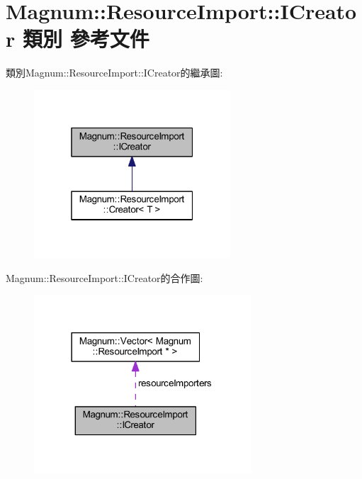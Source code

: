 \hypertarget{class_magnum_1_1_resource_import_1_1_i_creator}{}\section{Magnum\+:\+:Resource\+Import\+:\+:I\+Creator 類別 參考文件}
\label{class_magnum_1_1_resource_import_1_1_i_creator}


類別\+Magnum\+:\+:Resource\+Import\+:\+:I\+Creator的繼承圖\+:\nopagebreak
\begin{figure}[H]
\begin{center}
\leavevmode
\includegraphics[width=208pt]{class_magnum_1_1_resource_import_1_1_i_creator__inherit__graph}
\end{center}
\end{figure}


Magnum\+:\+:Resource\+Import\+:\+:I\+Creator的合作圖\+:\nopagebreak
\begin{figure}[H]
\begin{center}
\leavevmode
\includegraphics[width=230pt]{class_magnum_1_1_resource_import_1_1_i_creator__coll__graph}
\end{center}
\end{figure}

